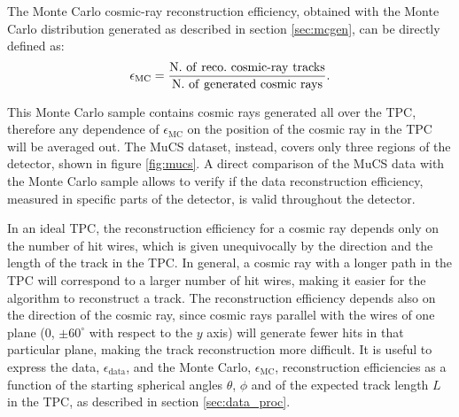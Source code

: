 \documentclass[a4paper,11pt]{article}
\def\myhyphen{{\hbox{-}}}
\begin{document}


The Monte Carlo cosmic-ray reconstruction efficiency, obtained with the Monte Carlo distribution generated as described in section \ref{sec:mcgen}, can be directly defined as:
\begin{equation}
  \epsilon_{\mathrm{MC}} = \frac{\mathrm{N.~of~reco.~cosmic\myhyphen ray~tracks}}{\mathrm{N.~of~generated~cosmic~rays}}.
\end{equation}

This Monte Carlo sample contains cosmic rays generated all over the TPC, therefore  any dependence of $\epsilon_{\mathrm{MC}}$ on the position of the cosmic ray in the TPC will be averaged out. The MuCS dataset, instead, covers only three regions of the detector, shown in figure \ref{fig:mucs}. A direct comparison of the MuCS data with the Monte Carlo sample allows to verify if the data reconstruction efficiency, measured in specific parts of the detector, is valid throughout the detector.

In an ideal TPC, the reconstruction efficiency for a cosmic ray depends only on the number of hit wires, which is given unequivocally by the direction and the length of the track in the TPC. In general, a cosmic ray with a longer path in the TPC will correspond to a larger number of hit wires, making it easier for the algorithm to reconstruct a track. The reconstruction efficiency depends also on the direction of the cosmic ray, since cosmic rays parallel with the wires of one plane (0, $\pm60^{\circ}$ with respect to the $y$ axis) will generate fewer hits in that particular plane, making the track reconstruction more difficult.
It is useful to express the data, $\epsilon_{\mathrm{data}}$, and the Monte Carlo, $\epsilon_{\mathrm{MC}}$, reconstruction efficiencies as a function of the starting spherical angles $\theta$, $\phi$ and of the expected track length $L$ in the TPC, as described in section \ref{sec:data_proc}.
\end{document}
